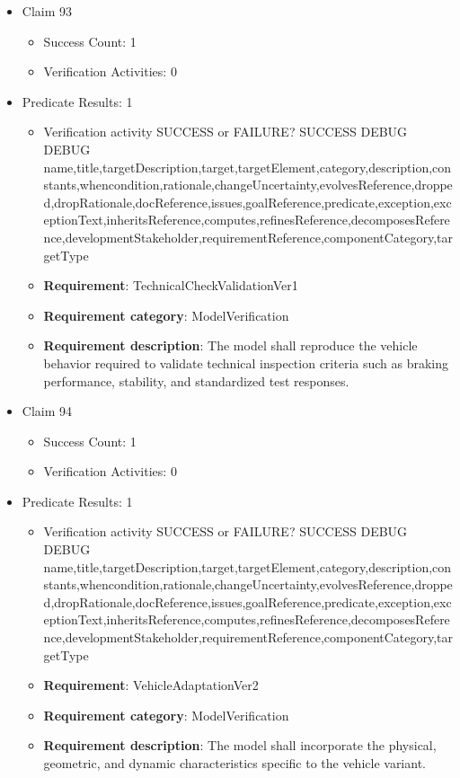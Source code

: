 \documentclass{article}
\begin{document}
\begin{itemize}
  				  \item Claim 93
				\begin{itemize}
			    	\item Success Count: 1 
			    	\item Verification Activities: 0
				\end{itemize}
				
									    
				\item Predicate Results: 1
					\begin{itemize}				
					\item Verification activity SUCCESS or FAILURE? SUCCESS
					DEBUG DEBUG name,title,targetDescription,target,targetElement,category,description,constants,whencondition,rationale,changeUncertainty,evolvesReference,dropped,dropRationale,docReference,issues,goalReference,predicate,exception,exceptionText,inheritsReference,computes,refinesReference,decomposesReference,developmentStakeholder,requirementReference,componentCategory,targetType
					\item \textbf{Requirement}: TechnicalCheckValidationVer1 
					\item \textbf{Requirement category}: ModelVerification
					\item \textbf{Requirement description}: The model shall reproduce the vehicle behavior required to validate technical inspection criteria such as braking performance, stability, and standardized test responses.
					\end{itemize}

  				  \item Claim 94
				\begin{itemize}
			    	\item Success Count: 1 
			    	\item Verification Activities: 0
				\end{itemize}
				
									    
				\item Predicate Results: 1
					\begin{itemize}				
					\item Verification activity SUCCESS or FAILURE? SUCCESS
					DEBUG DEBUG name,title,targetDescription,target,targetElement,category,description,constants,whencondition,rationale,changeUncertainty,evolvesReference,dropped,dropRationale,docReference,issues,goalReference,predicate,exception,exceptionText,inheritsReference,computes,refinesReference,decomposesReference,developmentStakeholder,requirementReference,componentCategory,targetType
					\item \textbf{Requirement}: VehicleAdaptationVer2 
					\item \textbf{Requirement category}: ModelVerification
					\item \textbf{Requirement description}: The model shall incorporate the physical, geometric, and dynamic characteristics specific to the vehicle variant.
					\end{itemize}


\end{itemize}
\end{document}
